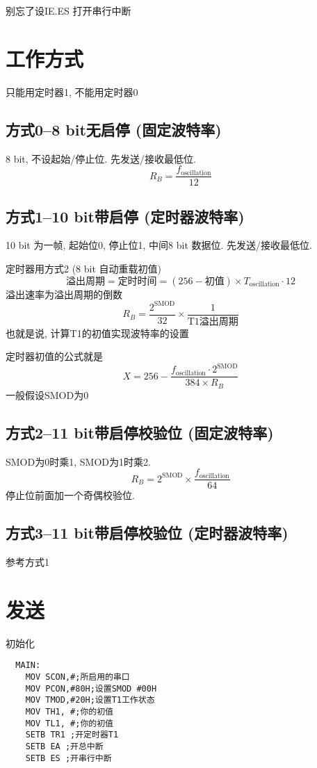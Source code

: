 \documentclass[a4paper]{report}
\begin{document}
别忘了设IE.ES 打开串行中断
\section{工作方式}
只能用定时器1, 不能用定时器0
\subsection{方式0--8 bit无启停 (固定波特率)}
8 bit, 不设起始/停止位. 先发送/接收最低位. 
\begin{equation}
  R_B=\frac{f_\text{oscillation}}{12}
\end{equation}
\subsection{方式1--10 bit带启停 (定时器波特率)}
10 bit 为一帧, 起始位0, 停止位1, 中间8 bit 数据位. 先发送/接收最低位. 

定时器用方式2 (8 bit 自动重载初值)
\begin{equation}
  \text{溢出周期}=\text{定时时间}=(256-\text{初值})\times T_{\text{oscillation}}\cdot 12
\end{equation}
溢出速率为溢出周期的倒数
\begin{equation}
  R_B=\frac{2^{\text{SMOD}}}{32}\times \frac{1}{\text{T1溢出周期}} 
\end{equation}
也就是说, 计算T1的初值实现波特率的设置

定时器初值的公式就是
\begin{equation}
  X=256-\frac{ f_\text{oscillation}\cdot 2^{\text{SMOD}}}{384\times R_B}
\end{equation}
一般假设SMOD为0
\subsection{方式2--11 bit带启停校验位 (固定波特率)}
SMOD为0时乘1, SMOD为1时乘2. 
\begin{equation}
  R_B=2^{\text{SMOD}}\times\frac{f_\text{oscillation}}{64}
\end{equation}
停止位前面加一个奇偶校验位. 
\subsection{方式3--11 bit带启停校验位 (定时器波特率)}
参考方式1
\section{发送}
初始化
\begin{verbatim}
  MAIN:
    MOV SCON,#;所启用的串口
    MOV PCON,#80H;设置SMOD #00H
    MOV TMOD,#20H;设置T1工作状态
    MOV TH1, #;你的初值
    MOV TL1, #;你的初值
    SETB TR1 ;开定时器T1
    SETB EA ;开总中断
    SETB ES ;开串行中断
\end{verbatim}
\end{document}
